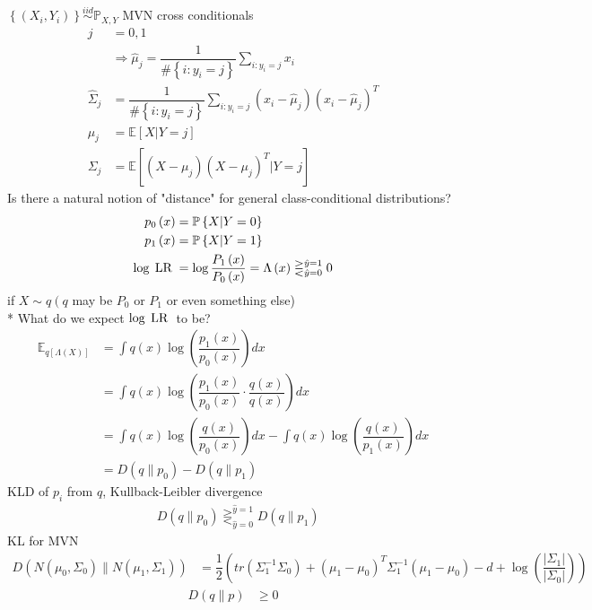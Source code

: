 \documentclass{article}
\begin{document}
$\left\{\left(X_{i}, Y_{i}\right)\right\} \stackrel{iid}{\sim} \mathbb{P}_{X,Y}$ MVN cross conditionals
\begin{align*}
j  &= 0, 1
\\ &\Rightarrow  \hat{\mu}_{j} = \dfrac{1}{\#\left\{i : y_{i} = j\right\}} \displaystyle\sum_{i : y_{i} = j} x_{i}
\\ \hat{\Sigma}_{j} &= \dfrac{1}{\#\left\{i : y_{i} = j\right\}} \displaystyle\sum_{i : y_{i} = j} \left(x_{i} - \hat{\mu}_{j}\right)\left(x_{i} - \hat{\mu}_{j}\right)^{T}
\\ \mu_{j} &= \mathbb{E}\left[X | Y = j\right]
\\ \Sigma_{j} &= \mathbb{E}\left[\left(X - \mu_{j}\right)\left(X - \mu_{j}\right)^{T} | Y = j\right]
\end{align*}
Is there a natural notion of "distance" for general class-conditional distributions?
\begin{align*}
p_{0}\left(x\right) &= \mathbb{P}\left\{X | Y = 0\right\}
\\ p_{1}\left(x\right) &= \mathbb{P}\left\{X | Y = 1\right\}
\\ \log \text{\;LR\;} &= \log \dfrac{P_{1}\left(x\right)}{P_{0}\left(x\right)} = \Lambda\left(x\right) \gtreqless^{\hat{y} = 1}_{\hat{y} = 0} 0
\end{align*}
if $X  \sim  q  \left(q \right.$ may be $P_{0}$ or $P_{1}$ or even something else)
\\* What do we expect $\log \text{\;LR\;}$ to be?
\begin{align*}
\mathbb{E}_{q\left[\Lambda\left(X\right)\right]} &= \displaystyle\int q\left(x\right) \log\left(\dfrac{p_{1}\left(x\right)}{p_{0}\left(x\right)}\right) dx
\\ &= \displaystyle\int q\left(x\right) \log\left(\dfrac{p_{1}\left(x\right)}{p_{0}\left(x\right)} \cdot  \dfrac{q\left(x\right)}{q\left(x\right)}\right) dx
\\ &= \displaystyle\int q\left(x\right) \log\left(\dfrac{q\left(x\right)}{p_{0}\left(x\right)}\right) dx - \displaystyle\int q\left(x\right) \log\left(\dfrac{q\left(x\right)}{p_{1}\left(x\right)}\right) dx
\\ &= D\left(q \| p_{0}\right) - D\left(q \| p_{1}\right)
\end{align*}
KLD of $p_{i}$ from $q $, Kullback-Leibler divergence
\begin{align*}
&D\left(q \| p_{0}\right)  \gtreqless^{\hat{y} = 1}_{\hat{y} = 0} D\left(q \| p_{1}\right) 
\end{align*}
KL for MVN
\begin{align*}
D\left(N\left(\mu_{0}, \Sigma_{0}\right) \| N\left(\mu_{1}, \Sigma_{1}\right)\right)  &= \dfrac{1}{2} \left(tr\left(\Sigma^{-1}_{1} \Sigma_{0}\right)  + \left(\mu_{1} - \mu_{0}\right)^{T} \Sigma^{-1}_{1} \left(\mu_{1} - \mu_{0}\right) - d + \log\left(\dfrac{| \Sigma_{1} |}{| \Sigma_{0} |}\right)\right)
\end{align*}
\begin{align*}
D\left(q \| p\right)  &\geq  0
\end{align*}
\end{document}
